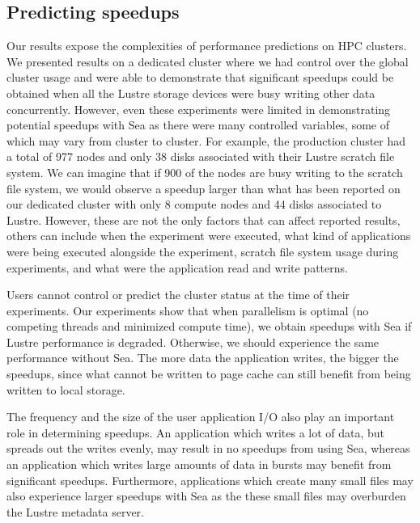 \documentclass[fleqn,10pt]{wlscirep}
\begin{document}
    \subsection{Predicting speedups}

    Our results expose the complexities of performance predictions on HPC clusters. We presented results on a dedicated cluster
    where we had
    control over the global cluster usage and were able to demonstrate that
    significant speedups could be obtained when all the Lustre storage devices were
    busy writing other data concurrently. However, even these experiments were
    limited in demonstrating potential speedups with Sea as there were many
    controlled variables, some of which may vary from cluster to cluster. For
    example, the production cluster had a total of 977 nodes and only 38 disks associated with
    their Lustre scratch file system. We can imagine that if 900 of the nodes
    are busy writing to the scratch file system, we would observe a speedup
    larger than what has been reported on our dedicated cluster with only 8 compute
    nodes and 44 disks associated to Lustre. However, these are not the only
    factors that can affect reported results, others can include when the
    experiment were executed, what kind of applications were being executed
    alongside the experiment, scratch file system usage during experiments, and
    what were the application read and write patterns.

    Users cannot control or predict the cluster status at the time of their
    experiments.
    Our experiments show that when parallelism is optimal (no competing threads
    and minimized compute time), we obtain speedups with Sea if Lustre
    performance is degraded. Otherwise, we should experience the same
    performance without Sea. The more data the application writes, the bigger
    the speedups, since what cannot be written to page cache can still benefit from
    being written to local storage.
    
    The frequency and the size of the user application I/O also play an
    important role in determining speedups. An application which writes a lot of
    data, but spreads out the writes evenly, may result in no speedups from
    using Sea, whereas an application which writes large amounts of data in
    bursts may benefit from significant speedups. Furthermore, applications
    which create many small files may also experience larger speedups with Sea
    as the these small files may overburden the Lustre metadata server.
\end{document}
